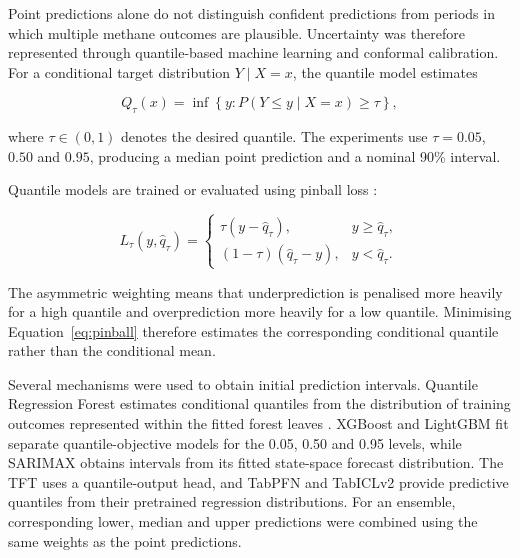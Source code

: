 Point predictions alone do not distinguish confident predictions from periods
in which multiple methane outcomes are plausible. Uncertainty was therefore
represented through quantile-based machine learning and conformal calibration.
For a conditional target distribution \(Y\mid X=x\), the quantile model
estimates

\begin{equation}
Q_{\tau}(x)
=
\inf\left\{
y:
P(Y\leq y\mid X=x)\geq\tau
\right\},
\end{equation}

where \(\tau\in(0,1)\) denotes the desired quantile. The experiments use
\(\tau=0.05\), \(0.50\) and \(0.95\), producing a median point prediction and a
nominal 90\% interval.

Quantile models are trained or evaluated using pinball loss
\cite{koenker1978quantiles}:

\begin{equation}
L_{\tau}(y,\hat{q}_{\tau})
=
\begin{cases}
\tau(y-\hat{q}_{\tau}),
& y\geq\hat{q}_{\tau},\\
(1-\tau)(\hat{q}_{\tau}-y),
& y<\hat{q}_{\tau}.
\end{cases}
\label{eq:pinball}
\end{equation}

The asymmetric weighting means that underprediction is penalised more heavily
for a high quantile and overprediction more heavily for a low quantile.
Minimising Equation~\ref{eq:pinball} therefore estimates the corresponding
conditional quantile rather than the conditional mean.


Several mechanisms were used to obtain initial prediction intervals. Quantile
Regression Forest estimates conditional quantiles from the distribution of
training outcomes represented within the fitted forest leaves
\cite{meinshausen2006qrf}. XGBoost and LightGBM fit separate
quantile-objective models for the 0.05, 0.50 and 0.95 levels, while SARIMAX
obtains intervals from its fitted state-space forecast distribution. The TFT
uses a quantile-output head, and TabPFN and TabICLv2 provide predictive
quantiles from their pretrained regression distributions. For an ensemble,
corresponding lower, median and upper predictions were combined using the same
weights as the point predictions.

